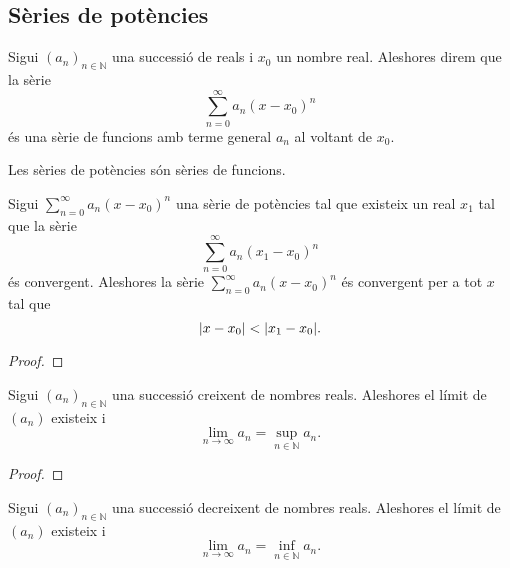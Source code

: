 \documentclass[../../Main.tex]{subfiles}
\begin{document}
	\subsection{Sèries de potències}
	\begin{definition}
		\label{def:sèrie de potències}
		Sigui \((a_{n})_{n\in\mathbb{N}}\) una successió de reals i \(x_{0}\) un nombre real. Aleshores direm que la sèrie
		\[\sum_{n=0}^{\infty}a_{n}(x-x_{0})^{n}\]
		és una sèrie de funcions amb terme general \(a_{n}\) al voltant de \(x_{0}\).
	\end{definition}
	\begin{observation}
		\label{obs:les sèries de potències són sèries de funcions}
		Les sèries de potències són sèries de funcions.
	\end{observation}
	\begin{proposition}
		\label{prop:radi de convergència d'una sèrie de potències}
		Sigui \(\sum_{n=0}^{\infty}a_{n}(x-x_{0})^{n}\) una sèrie de potències tal que existeix un real \(x_{1}\) tal que la sèrie
		\[\sum_{n=0}^{\infty}a_{n}(x_{1}-x_{0})^{n}\]
		és convergent. Aleshores la sèrie \(\sum_{n=0}^{\infty}a_{n}(x-x_{0})^{n}\) és convergent per a tot \(x\) tal que
		\[\abs{x-x_{0}}<\abs{x_{1}-x_{0}}.\]
		\begin{proof}
		\end{proof}
	\end{proposition}
	\begin{lemma}
		\label{lema:les successions creixents tenen límit i aquest és el suprem de la successió}
		Sigui \((a_{n})_{n\in\mathbb{N}}\) una successió creixent de nombres reals. Aleshores el límit de \((a_{n})\) existeix i
		\[\lim_{n\to\infty}a_{n}=\sup_{n\in\mathbb{N}}a_{n}.\]
		\begin{proof}
		\end{proof}
	\end{lemma}
	\begin{corollary}
		\label{cor:les successions decreixent tenen límit i aquest és el ínfim de la successió}
		Sigui \((a_{n})_{n\in\mathbb{N}}\) una successió decreixent de nombres reals. Aleshores el límit de \((a_{n})\) existeix i
		\[\lim_{n\to\infty}a_{n}=\inf_{n\in\mathbb{N}}a_{n}.\]
	\end{corollary}
\end{document}
